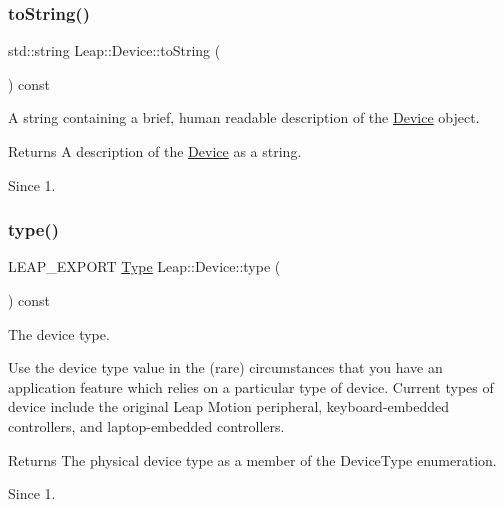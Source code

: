 \subsubsection{\texorpdfstring{to\+String()}{toString()}}
{\footnotesize\ttfamily std\+::string Leap\+::\+Device\+::to\+String (\begin{DoxyParamCaption}{ }\end{DoxyParamCaption}) const\hspace{0.3cm}{\ttfamily [inline]}}

A string containing a brief, human readable description of the \hyperlink{class_leap_1_1_device}{Device} object.

\begin{DoxyReturn}{Returns}
A description of the \hyperlink{class_leap_1_1_device}{Device} as a string. 
\end{DoxyReturn}
\begin{DoxySince}{Since}
1. 
\end{DoxySince}
\mbox{\label{class_leap_1_1_device_a3668b9d01ca7e2fbbf1a2a313abe799a}} 
\subsubsection{\texorpdfstring{type()}{type()}}
{\footnotesize\ttfamily L\+E\+A\+P\+\_\+\+E\+X\+P\+O\+RT \hyperlink{class_leap_1_1_device_a1b7477f6d382b15a77a00712a70628b2}{Type} Leap\+::\+Device\+::type (\begin{DoxyParamCaption}{ }\end{DoxyParamCaption}) const}

The device type.

Use the device type value in the (rare) circumstances that you have an application feature which relies on a particular type of device. Current types of device include the original Leap Motion peripheral, keyboard-\/embedded controllers, and laptop-\/embedded controllers.

\begin{DoxyReturn}{Returns}
The physical device type as a member of the Device\+Type enumeration. 
\end{DoxyReturn}
\begin{DoxySince}{Since}
1. 
\end{DoxySince}
\mbox{\label{class_leap_1_1_device_ac7b494b9dba80bdd97c33eff0b718691}} 
